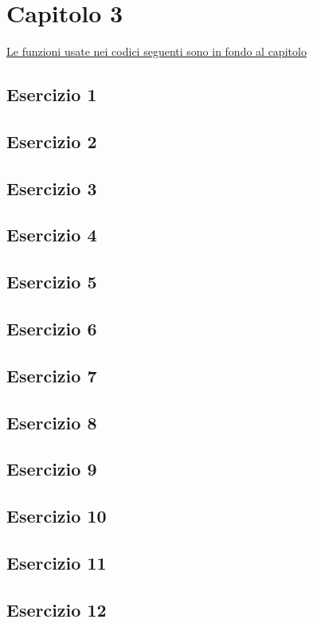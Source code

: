 \section{Capitolo 3}
\underline{Le funzioni usate nei codici seguenti sono in fondo al capitolo}
\subsection{Esercizio 1}

\subsection{Esercizio 2}

\subsection{Esercizio 3}

\subsection{Esercizio 4}

\subsection{Esercizio 5}

\subsection{Esercizio 6}

\subsection{Esercizio 7}

\subsection{Esercizio 8}

\subsection{Esercizio 9}

\subsection{Esercizio 10}

\subsection{Esercizio 11}

\subsection{Esercizio 12}

\newpage
